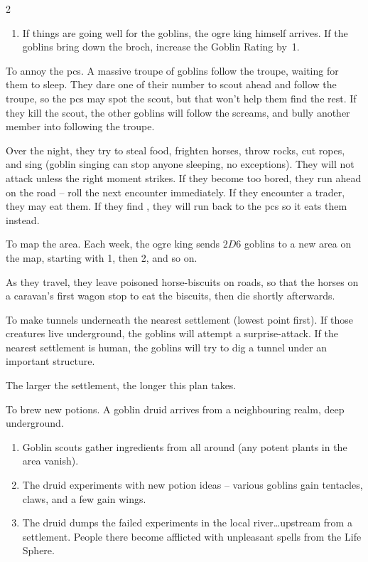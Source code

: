 \begin{multicols}{2}
\begin{dlist}
\begin{enumerate}
    From this point on, no more supplies reach the \gls{broch} -- the goblins eat every trader, including those with \glspl{guard}.
    If the troupe destroy the food, the goblins will be forced to attack directly.
    \item
    If things are going well for the goblins, the \gls{ogre} king himself arrives.
    If the goblins bring down the \gls{broch}, increase the Goblin Rating by~1.
  \end{enumerate}
  \item
  To annoy the \glspl{pc}.
  A massive troupe of goblins follow the troupe, waiting for them to sleep.
  They dare one of their number to scout ahead and follow the troupe, so the \glspl{pc} may spot the scout, but that won't help them find the rest.
  If they kill the scout, the other goblins will follow the screams, and bully another member into following the troupe.

  Over the night, they try to steal food, frighten horses, throw rocks, cut ropes, and sing (goblin singing can stop anyone sleeping, no exceptions).
  They will not attack unless the right moment strikes.
  If they become too bored, they run ahead on the road -- roll the next encounter immediately.
  If they encounter a trader, they may eat them.
  If they find , they will run back to the \glspl{pc} so it eats them instead.
  \item
  To map the area.
  Each week, the \gls{ogre} king sends $2D6$ goblins to a new area on the map, starting with 1, then 2, and so on.

  As they travel, they leave poisoned horse-biscuits on roads, so that the horses on a caravan's first wagon stop to eat the biscuits, then die shortly afterwards.
  \item
  To make tunnels underneath the nearest settlement (lowest point first).
  If those creatures live underground, the goblins will attempt a surprise-attack.
  If the nearest settlement is human, the goblins will try to dig a tunnel under an important structure.

  The larger the settlement, the longer this plan takes.
  \item
  To brew new potions.
  A goblin druid arrives from a neighbouring realm, deep underground.

  \null
  \begin{enumerate}%
    \item
    Goblin scouts gather \glspl{ingredient} from all around (any potent plants in the area vanish).
    \item
    The druid experiments with new potion ideas -- various goblins gain tentacles, claws, and a few gain wings.
    \item
    The druid dumps the failed experiments in the local river\ldots upstream from a settlement.
    People there become afflicted with unpleasant spells from the Life Sphere.
  \end{enumerate}
\end{dlist}



\end{multicols}


